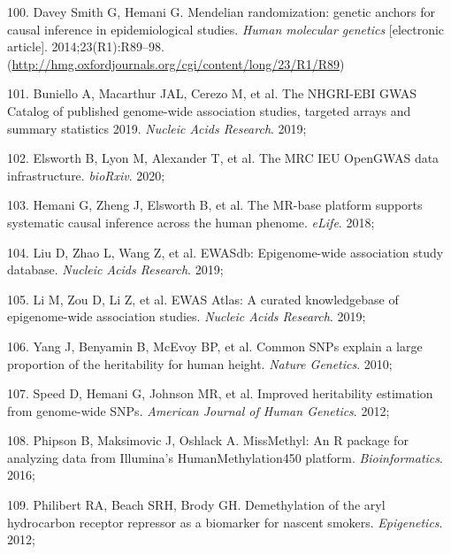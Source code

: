 \documentclass[11pt,oneside]{bristolthesis}
\newenvironment{cslreferences}%
  {}%
  {\par}
\begin{document}
\begin{cslreferences}
\leavevmode\hypertarget{ref-DaveySmith2014}{}%
100. Davey Smith G, Hemani G. Mendelian randomization: genetic anchors for causal inference in epidemiological studies. \emph{Human molecular genetics} {[}electronic article{]}. 2014;23(R1):R89--98. (\url{http://hmg.oxfordjournals.org/cgi/content/long/23/R1/R89})

\leavevmode\hypertarget{ref-Buniello2019}{}%
101. Buniello A, Macarthur JAL, Cerezo M, et al. The NHGRI-EBI GWAS Catalog of published genome-wide association studies, targeted arrays and summary statistics 2019. \emph{Nucleic Acids Research}. 2019;

\leavevmode\hypertarget{ref-Elsworth2020}{}%
102. Elsworth\hspace{0pt} B, Lyon\hspace{0pt} M, Alexander\hspace{0pt} T, et al. The MRC IEU OpenGWAS data infrastructure. \emph{bioRxiv}. 2020;

\leavevmode\hypertarget{ref-Hemani2018}{}%
103. Hemani G, Zheng J, Elsworth B, et al. The MR-base platform supports systematic causal inference across the human phenome. \emph{eLife}. 2018;

\leavevmode\hypertarget{ref-Liu2019}{}%
104. Liu D, Zhao L, Wang Z, et al. EWASdb: Epigenome-wide association study database. \emph{Nucleic Acids Research}. 2019;

\leavevmode\hypertarget{ref-Li2019}{}%
105. Li M, Zou D, Li Z, et al. EWAS Atlas: A curated knowledgebase of epigenome-wide association studies. \emph{Nucleic Acids Research}. 2019;

\leavevmode\hypertarget{ref-Yang2010}{}%
106. Yang J, Benyamin B, McEvoy BP, et al. Common SNPs explain a large proportion of the heritability for human height. \emph{Nature Genetics}. 2010;

\leavevmode\hypertarget{ref-Speed2012}{}%
107. Speed D, Hemani G, Johnson MR, et al. Improved heritability estimation from genome-wide SNPs. \emph{American Journal of Human Genetics}. 2012;

\leavevmode\hypertarget{ref-Phipson2016}{}%
108. Phipson B, Maksimovic J, Oshlack A. MissMethyl: An R package for analyzing data from Illumina's HumanMethylation450 platform. \emph{Bioinformatics}. 2016;

\leavevmode\hypertarget{ref-Philibert2012}{}%
109. Philibert RA, Beach SRH, Brody GH. Demethylation of the aryl hydrocarbon receptor repressor as a biomarker for nascent smokers. \emph{Epigenetics}. 2012;


\end{cslreferences}
\end{document}
